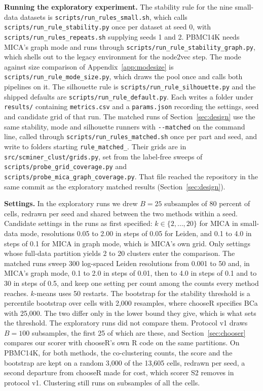 \textbf{Running the exploratory experiment.} The stability rule for the nine small-data datasets is
\texttt{scripts/run\_rules\_small.sh}, which calls
\texttt{scripts/run\_rule\_stability.py} once per dataset at seed 0, with
\texttt{scripts/run\_rules\_repeats.sh} supplying seeds 1 and 2. PBMC14K needs MICA's
graph mode and runs through \texttt{scripts/run\_rule\_stability\_graph.py}, which shells
out to the legacy environment for the node2vec step. The mode against size comparison of
Appendix~\ref{app:modesize} is \texttt{scripts/run\_rule\_mode\_size.py}, which draws the
pool once and calls both pipelines on it. The silhouette rule is
\texttt{scripts/run\_rule\_silhouette.py} and the shipped defaults are
\texttt{scripts/run\_rule\_default.py}. Each writes a folder under \texttt{results/}
containing \texttt{metrics.csv} and a \texttt{params.json} recording the settings, seed
and candidate grid of that run. The matched runs of Section~\ref{sec:design} use the
same stability, mode and silhouette runners with \texttt{-{}-matched} on the command line,
called through \texttt{scripts/run\_rules\_matched.sh} once per part and seed, and write to
folders starting \texttt{rule\_matched\_}. Their grids are in
\texttt{src/scminer\_clust/grids.py}, set from the label-free sweeps of \texttt{scripts/probe\_grid\_coverage.py} and \texttt{scripts/probe\_mica\_graph\_coverage.py}. That file reached the repository in the same commit as the exploratory matched results (Section~\ref{sec:design}).

\textbf{Settings.} In the exploratory runs we drew $B = 25$ subsamples of 80 percent of cells, redrawn per seed and shared between the two methods within a seed. Candidate settings in the runs as first specified:
$k \in \{2,\dots,20\}$ for MICA
in small-data mode, resolutions 0.05 to 2.00 in steps of 0.05 for Leiden, and 0.1 to 4.0 in
steps of 0.1 for MICA in graph mode, which is MICA's own grid. Only settings whose
full-data partition yields 2 to 20 clusters enter the comparison. The matched runs sweep 300
log-spaced Leiden resolutions from 0.001 to 50 and, in MICA's graph mode, 0.1 to 2.0 in steps
of 0.01, then to 4.0 in steps of 0.1 and to 30 in steps of 0.5, and keep one setting per count
among the counts every method reaches. $k$-means uses 50
restarts. The bootstrap for the stability threshold is a percentile bootstrap over cells with
2,000 resamples, where chooseR specifies BCa with 25,000. The two differ only in the
lower bound they give, which is what sets the threshold. The exploratory runs did not compare them.
Protocol v1 draws $B = 100$ subsamples, the first 25 of which are these, and
Section~\ref{sec:chooser} compares our scorer with chooseR's own R code on the same partitions. On PBMC14K, for both methods, the co-clustering counts, the score and the bootstrap are kept on a random 3,000 of the 13,605 cells, redrawn per seed, a second departure from chooseR made for cost, which scorer S2 removes in protocol v1. Clustering still runs on subsamples of all the cells.

